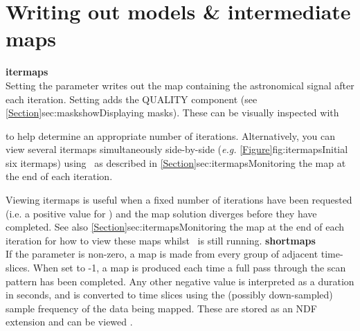 \section{Writing out models \& intermediate maps}
\label{sec:inter}

\textbf{itermaps}\\
Setting the parameter  writes out the
map containing the astronomical signal after each iteration. Setting
 adds the QUALITY component
(see \cref{Section}{sec:maskshow}{Displaying masks)}.  These can be visually inspected with

\begin{terminalv}
\end{terminalv}

to help determine an appropriate number of iterations. Alternatively, you
can view several itermaps simultaneously side-by-side (\emph{e.g.}
\cref{Figure}{fig:itermaps}{Initial six itermaps}) using \Kappa\ as
described in \cref{Section}{sec:itermaps}{Monitoring the map at the
end of each iteration}.

Viewing itermaps is useful when a fixed number of iterations have been requested (i.e. a positive
value for ) and the map solution diverges before
they have completed. See also \cref{Section}{sec:itermaps}{Monitoring the map
at the end of each iteration} for how to view these maps whilst \makemap\ is still running.
\newline\newline
\textbf{shortmaps}\\
If the parameter  is non-zero, a map is made from
every group of adjacent time-slices. When set to -1, a map is produced
each time a full pass through the scan pattern has been completed. Any
other negative value is interpreted as a duration in seconds, and is converted
to time slices using the (possibly down-sampled) sample frequency of the
data being mapped. These are stored as an NDF extension and can be viewed \gaia.

